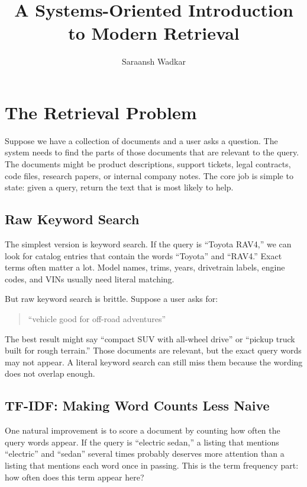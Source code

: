 \documentclass[12pt]{article}
\title{A Systems-Oriented Introduction to Modern Retrieval}
\author{Saraansh Wadkar}
\date{}
\begin{document}
\maketitle
\tableofcontents
\newpage

\section{The Retrieval Problem}

Suppose we have a collection of documents and a user asks a question. The
system needs to find the parts of those documents that are relevant to the
query. The documents might be product descriptions, support tickets, legal
contracts, code files, research papers, or internal company notes. The
core job is simple to state: given a query, return the text that is most
likely to help.

\subsection{Raw Keyword Search}

The simplest version is keyword search. If the query is ``Toyota RAV4,''
we can look for catalog entries that contain the words ``Toyota'' and
``RAV4.'' Exact terms often matter a lot. Model names, trims, years,
drivetrain labels, engine codes, and VINs usually need literal matching.

But raw keyword search is brittle. Suppose a user asks for:

\begin{quote}
``vehicle good for off-road adventures''
\end{quote}

The best result might say ``compact SUV with all-wheel drive'' or
``pickup truck built for rough terrain.'' Those documents are relevant,
but the exact query words may not appear. A literal keyword search can
still miss them because the wording does not overlap enough.

\subsection{TF-IDF: Making Word Counts Less Naive}

One natural improvement is to score a document by counting how often the
query words appear. If the query is ``electric sedan,'' a listing that
mentions ``electric'' and ``sedan'' several times probably deserves more
attention than a listing that mentions each word once in passing. This is
the term frequency part: how often does this term appear here?
\end{document}
